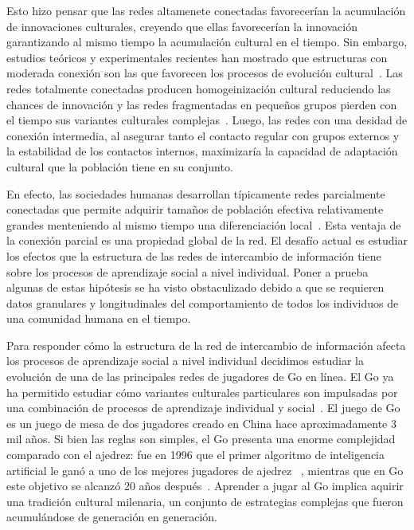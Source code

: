 \documentclass[a4paper,11pt]{book}
\theoremstyle{definition}
\begin{document}
Esto hizo pensar que las redes altamenete conectadas favorecerían la acumulación de innovaciones culturales, creyendo que ellas favorecerían la innovación garantizando al mismo tiempo la acumulación cultural en el tiempo.
%
Sin embargo, estudios teóricos y experimentales recientes han mostrado que estructuras con moderada conexión son las que favorecen los procesos de evolución cultural~\cite{Derex2020}.
%
Las redes totalmente conectadas producen homogeinización cultural reduciendo las chances de innovación y las redes fragmentadas en pequeños grupos pierden con el tiempo sus variantes culturales complejas~\cite{derex2018-divideAndConquer,Creanza2017}.
%
Luego, las redes con una desidad de conexión intermedia, al asegurar tanto el contacto regular con grupos externos y la estabilidad de los contactos internos, maximizaría la capacidad de adaptación cultural que la población tiene en su conjunto.

En efecto, las sociedades humanas desarrollan típicamente redes parcialmente conectadas que permite adquirir tamaños de población efectiva relativamente grandes menteniendo al mismo tiempo una diferenciación local~\cite{padilla2022-interconnectivity,migliano2017-hunterGathererNetwork}.
%
Esta ventaja de la conexión parcial es una propiedad global de la red.
%
El desafío actual es estudiar los efectos que la estructura de las redes de intercambio de información tiene sobre los procesos de aprendizaje social a nivel individual.
%
Poner a prueba algunas de estas hipótesis se ha visto obstaculizado debido a que se requieren datos granulares y longitudinales del comportamiento de todos los individuos de una comunidad humana en el tiempo.

Para responder cómo la estructura de la red de intercambio de información afecta los procesos de aprendizaje social a nivel individual decidimos estudiar la evolución de una de las principales redes de jugadores de Go en línea.
%
El Go ya ha permitido estudiar cómo variantes culturales particulares son impulsadas por una combinación de procesos de aprendizaje individual y social~\cite{Beheim2014}.
El juego de Go es un juego de mesa de dos jugadores creado en China hace aproximadamente 3 mil años.
%
Si bien las reglas son simples, el Go presenta una enorme complejidad comparado con el ajedrez: fue en 1996 que el primer algoritmo de inteligencia artificial le ganó a uno de los mejores jugadores de ajedrez ~\cite{Campbell2002}, mientras que en Go este objetivo se alcanzó 20 años después~\cite{Silver2016}.
%
%
Aprender a jugar al Go implica aquirir una tradición cultural milenaria, un conjunto de estrategias complejas que fueron acumulándose de generación en generación.
\end{document}
